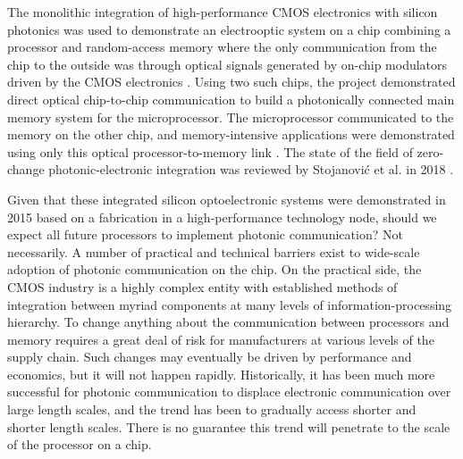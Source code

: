 The monolithic integration of high-performance CMOS electronics with silicon photonics was used to demonstrate an electrooptic system on a chip combining a processor and random-access memory where the only communication from the chip to the outside was through optical signals generated by on-chip modulators driven by the CMOS electronics \cite{suwa2015}. Using two such chips, the project demonstrated direct optical chip-to-chip communication to build a photonically connected main memory system for the microprocessor. The microprocessor communicated to the memory on the other chip, and memory-intensive applications were demonstrated using only this optical processor-to-memory link \cite{suwa2015}. The state of the field of zero-change photonic-electronic integration was reviewed by Stojanovi\'{c} et al. in 2018 \cite{stra2018}.

Given that these integrated silicon optoelectronic systems were demonstrated in 2015 based on a fabrication in a high-performance technology node, should we expect all future processors to implement photonic communication? Not necessarily. A number of practical and technical barriers exist to wide-scale adoption of photonic communication on the chip. On the practical side, the CMOS industry is a highly complex entity with established methods of integration between myriad components at many levels of information-processing hierarchy. To change anything about the communication between processors and memory requires a great deal of risk for manufacturers at various levels of the supply chain. Such changes may eventually be driven by performance and economics, but it will not happen rapidly. Historically, it has been much more successful for photonic communication to displace electronic communication over large length scales, and the trend has been to gradually access shorter and shorter length scales. There is no guarantee this trend will penetrate to the scale of the processor on a chip. 

